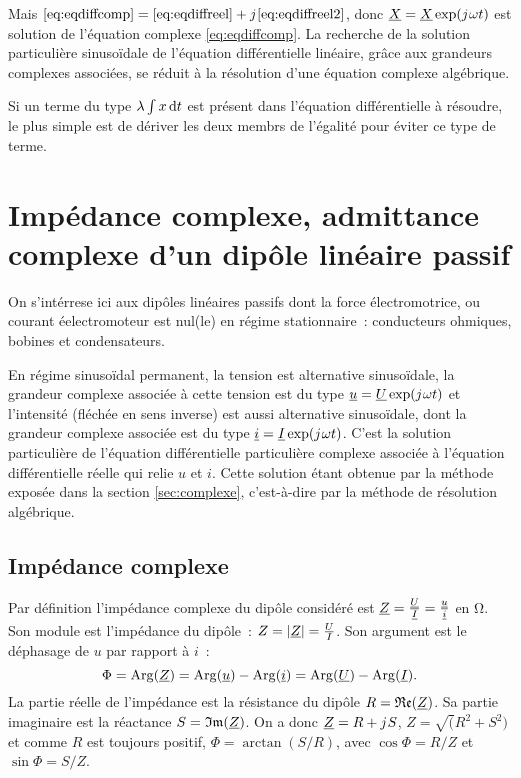         Mais $\eqref{eq:eqdiffcomp} = \eqref{eq:eqdiffreel} + {j\mkern1mu} \eqref{eq:eqdiffreel2}$, donc $\underline{X} = \underline{X} \exp({j\mkern1mu}\omega t)$ est solution de l'équation complexe \eqref{eq:eqdiffcomp}. La recherche de la solution particulière sinusoïdale de l'équation différentielle linéaire, grâce aux grandeurs complexes associées, se réduit à la résolution d'une équation complexe algébrique.

        Si un terme du type $\lambda \int x \mathop{}\mathopen{}\mathrm{d}{}t$ est présent dans l'équation différentielle à résoudre, le plus simple est de dériver les deux membrs de l'égalité pour éviter ce type de terme.
\section{Impédance complexe, admittance complexe d'un dipôle linéaire passif}
    On s'intérrese ici aux dipôles linéaires passifs dont la force électromotrice, ou courant éelectromoteur est nul(le) en régime stationnaire~: conducteurs ohmiques, bobines et condensateurs.

    En régime sinusoïdal permanent, la tension est alternative sinusoïdale, la grandeur complexe associée à cette tension est du type $\underline{u} = \underline{U} \exp({j\mkern1mu}\omega t)$ et l'intensité (fléchée en sens inverse) est aussi alternative sinusoïdale, dont la grandeur complexe associée est du type $\underline{i} = \underline{I} \exp({j\mkern1mu}\omega t)$. C'est la solution particulière de l'équation différentielle particulière complexe associée à l'équation différentielle réelle qui relie $u$ et $i$. Cette solution étant obtenue par la méthode exposée dans la section \ref{sec:complexe}, c'est-à-dire par la méthode de résolution algébrique.
    \subsection{Impédance complexe}
        Par définition l'impédance complexe du dipôle considéré est $\underline{Z} = \frac{\underline{U}}{\underline{I}}=\frac{\underline{u}}{\underline{i}}$ en $\si{\ohm}$. Son module est l'impédance du dipôle~: $Z = \left\lvert\underline{Z}\right\rvert = \frac{U}{I}$. Son argument est le déphasage de $u$ par rapport à $i$~:
        \begin{equation}
            \Phi = \operatorname{Arg}(\underline{Z}) = \operatorname{Arg}(\underline{u}) - \operatorname{Arg}(\underline{i}) = \operatorname{Arg}(\underline{U}) - \operatorname{Arg}(\underline{I}).
        \end{equation}
        La partie réelle de l'impédance est la résistance du dipôle $R = \mathfrak{Re}(\underline{Z})$. Sa partie imaginaire est la réactance $S=\mathfrak{Im}(\underline{Z})$. On a donc $\underline{Z} = R + {j\mkern1mu} S$, $Z = \sqrt(R^2+S^2)$ et comme $R$ est toujours positif, $\Phi = \arctan(S/R)$, avec $\cos\Phi = R/Z$ et $\sin\Phi=S/Z$.
